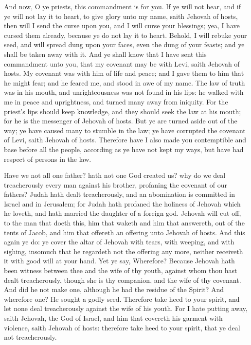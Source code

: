 And now, O ye priests, this commandment is for you. If ye will not hear, and if ye will not lay it to heart, to give glory unto my name, saith Jehovah of hosts, then will I send the curse upon you, and I will curse your blessings; yea, I have cursed them already, because ye do not lay it to heart. Behold, I will rebuke your seed, and will spread dung upon your faces, even the dung of your feasts; and ye shall be taken away with it. And ye shall know that I have sent this commandment unto you, that my covenant may be with Levi, saith Jehovah of hosts. My covenant was with him of life and peace; and I gave them to him that he might fear; and he feared me, and stood in awe of my name. The law of truth was in his mouth, and unrighteousness was not found in his lips: he walked with me in peace and uprightness, and turned many away from iniquity. For the priest’s lips should keep knowledge, and they should seek the law at his mouth; for he is the messenger of Jehovah of hosts. But ye are turned aside out of the way; ye have caused many to stumble in the law; ye have corrupted the covenant of Levi, saith Jehovah of hosts. Therefore have I also made you contemptible and base before all the people, according as ye have not kept my ways, but have had respect of persons in the law.  

Have we not all one father? hath not one God created us? why do we deal treacherously every man against his brother, profaning the covenant of our fathers? Judah hath dealt treacherously, and an abomination is committed in Israel and in Jerusalem; for Judah hath profaned the holiness of Jehovah which he loveth, and hath married the daughter of a foreign god. Jehovah will cut off, to the man that doeth this, him that waketh and him that answereth, out of the tents of Jacob, and him that offereth an offering unto Jehovah of hosts. And this again ye do: ye cover the altar of Jehovah with tears, with weeping, and with sighing, insomuch that he regardeth not the offering any more, neither receiveth it with good will at your hand. Yet ye say, Wherefore? Because Jehovah hath been witness between thee and the wife of thy youth, against whom thou hast dealt treacherously, though she is thy companion, and the wife of thy covenant. And did he not make one, although he had the residue of the Spirit? And wherefore one? He sought a godly seed. Therefore take heed to your spirit, and let none deal treacherously against the wife of his youth. For I hate putting away, saith Jehovah, the God of Israel, and him that covereth his garment with violence, saith Jehovah of hosts: therefore take heed to your spirit, that ye deal not treacherously.  

